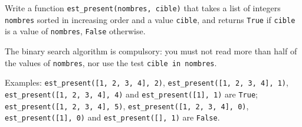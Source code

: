 Write a function \texttt{est\_present(nombres, cible)} that takes a list of integers \texttt{nombres} sorted in increasing order and a value \texttt{cible}, and returns \texttt{True} if \texttt{cible} is a value of \texttt{nombres}, \texttt{False} otherwise.

The binary search algorithm is compulsory: you must not read more than half of the values of \texttt{nombres}, nor use the test \texttt{cible in nombres}.

Examples: \texttt{est\_present([1, 2, 3, 4], 2)}, \texttt{est\_present([1, 2, 3, 4], 1)}, \texttt{est\_present([1, 2, 3, 4], 4)} and \texttt{est\_present([1], 1)} are \texttt{True}; \texttt{est\_present([1, 2, 3, 4], 5)}, \texttt{est\_present([1, 2, 3, 4], 0)}, \texttt{est\_present([1], 0)} and \texttt{est\_present([], 1)} are \texttt{False}.
